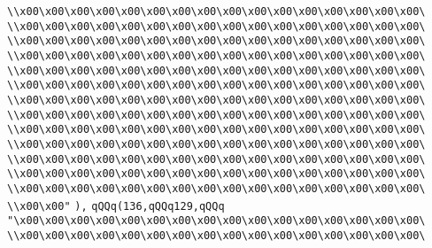 \verb|\\x00\x00\x00\x00\x00\x00\x00\x00\x00\x00\x00\x00\x00\x00\x00\x00\|\newline
\verb|\\x00\x00\x00\x00\x00\x00\x00\x00\x00\x00\x00\x00\x00\x00\x00\x00\|\newline
\verb|\\x00\x00\x00\x00\x00\x00\x00\x00\x00\x00\x00\x00\x00\x00\x00\x00\|\newline
\verb|\\x00\x00\x00\x00\x00\x00\x00\x00\x00\x00\x00\x00\x00\x00\x00\x00\|\newline
\verb|\\x00\x00\x00\x00\x00\x00\x00\x00\x00\x00\x00\x00\x00\x00\x00\x00\|\newline
\verb|\\x00\x00\x00\x00\x00\x00\x00\x00\x00\x00\x00\x00\x00\x00\x00\x00\|\newline
\verb|\\x00\x00\x00\x00\x00\x00\x00\x00\x00\x00\x00\x00\x00\x00\x00\x00\|\newline
\verb|\\x00\x00\x00\x00\x00\x00\x00\x00\x00\x00\x00\x00\x00\x00\x00\x00\|\newline
\verb|\\x00\x00\x00\x00\x00\x00\x00\x00\x00\x00\x00\x00\x00\x00\x00\x00\|\newline
\verb|\\x00\x00\x00\x00\x00\x00\x00\x00\x00\x00\x00\x00\x00\x00\x00\x00\|\newline
\verb|\\x00\x00\x00\x00\x00\x00\x00\x00\x00\x00\x00\x00\x00\x00\x00\x00\|\newline
\verb|\\x00\x00\x00\x00\x00\x00\x00\x00\x00\x00\x00\x00\x00\x00\x00\x00\|\newline
\verb|\\x00\x00\x00\x00\x00\x00\x00\x00\x00\x00\x00\x00\x00\x00\x00\x00\|\newline
\verb|\\x00\x00"|\newline
\verb|),|\newline
\verb|qQQq(136,qQQq129,qQQq|\newline
\verb|"\x00\x00\x00\x00\x00\x00\x00\x00\x00\x00\x00\x00\x00\x00\x00\x00\|\newline
\verb|\\x00\x00\x00\x00\x00\x00\x00\x00\x00\x00\x00\x00\x00\x00\x00\x00\|\newline
